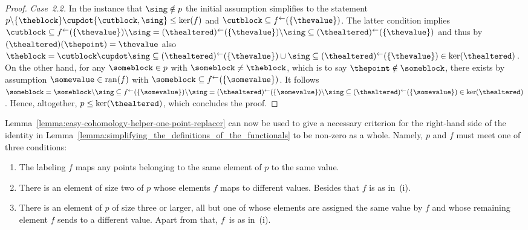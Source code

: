 \documentclass[10pt,a4paper]{amsart}
\numberwithin{equation}{section}
\newcommand{\sranx}[1]{\mathrm{ran}(#1)}
\newcommand{\subproof}[1]{\textit{#1}}
\newcommand{\spimgx}[2]{#1^{\leftarrow}(#2)}
\newcommand{\finerthan}{\mathrel{\leq}}
\newcommand{\Yp}[1]{\mathtt{#1}}
\begin{document}
{\begin{proof}
    \subproof{Case~2.2.} In the instance that $\sing\notin\thepartition$   the initial assumption  simplifies to the statement $\thepartition\backslash \{\theblock\}\cupdot\{\cutblock,\sing\}\finerthan\ker(\theind)$ and $\cutblock\subseteq \spimgx{\theind}{\{\thevalue\}}$. The latter condition implies $\cutblock\subseteq \spimgx{\theind}{\{\thevalue\}}\backslash \sing=\spimgx{(\thealtered)}{\{\thevalue\}}\backslash \sing\subseteq \spimgx{(\thealtered)}{\{\thevalue\}}$ and thus by $(\thealtered)(\thepoint)=\thevalue$ also $\theblock=\cutblock\cupdot\sing\subseteq \spimgx{(\thealtered)}{\{\thevalue\}}\cup \sing\subseteq \spimgx{(\thealtered)}{\{\thevalue\}}\in\ker(\thealtered)$. On the other hand, for any $\someblock\in\thepartition$ with $\someblock\neq \theblock$, which is to say $\thepoint\notin\someblock$, there exists by assumption $\somevalue\in \sranx{\theind}$ with $\someblock\subseteq \spimgx{\theind}{\{\somevalue\}}$. It follows $\someblock=\someblock\backslash\sing\subseteq \spimgx{\theind}{\{\somevalue\}}\backslash\sing=\spimgx{(\thealtered)}{\{\somevalue\}}\backslash\sing\subseteq\spimgx{(\thealtered)}{\{\somevalue\}}\in\ker(\thealtered)$. Hence, altogether,  $\thepartition\finerthan\ker(\thealtered)$, which concludes the proof.
  \end{proof}
}

{
  \newcommand{\thepartition}{p}
  \newcommand{\theind}{f}
  \newcommand{\ourpoint}{\Yp{z}}
  \newcommand{\ourvalue}{s}
  Lem\-ma~\ref{lemma:easy-cohomology-helper-one-point-replacer} can now be used to give a necessary criterion for the right-hand side of the identity in  Lem\-ma~\ref{lemma:simplifying_the_definitions_of_the_functionals} to be non-zero as a whole. Namely, $\thepartition$ and $\theind$ must meet one of three conditions:
\begin{enumerate}\itemsep=0pt
\item[(i)] The labeling $\theind$ maps any points belonging to the same element of $\thepartition$ to the same value.
\item[(ii)]
  There is an element of size two of $\thepartition$ whose elements $\theind$ maps to different values. Besides that $\theind$ is as in~(i).
\item[(iii)]
There is an element  of $\thepartition$ of size three or larger, all but one of whose elements are assigned the same value by $\theind$ and whose remaining element  $\theind$  sends to a different value. Apart from that, $\theind$~is as in~(i).
\end{enumerate}
}
\end{document}
